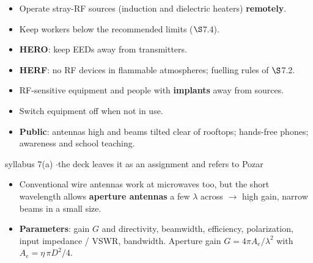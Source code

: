 {
\begin{itemize}
  \item Operate stray-RF sources (induction and dielectric heaters) \textbf{remotely}.
  \item Keep workers below the recommended limits ($\S$7.4).
  \item \textbf{HERO}: keep EEDs away from transmitters.
  \item \textbf{HERF}: no RF devices in flammable atmospheres; fuelling rules of $\S$7.2.
  \item RF-sensitive equipment and people with \textbf{implants} away from sources.
  \item Switch equipment off when not in use.
  \item \textbf{Public}: antennas high and beams tilted clear of rooftops; hands-free phones;
    awareness and school teaching.
\end{itemize}}

\vspace{2pt}


{\color{sub}\footnotesize syllabus 7(a) \gap$\cdot$\gap the deck leaves it as an assignment and refers to Pozar}

\begin{itemize}
  \item Conventional wire antennas work at microwaves too, but the short wavelength allows
    \textbf{aperture antennas} a few $\lambda$ across $\rightarrow$ high gain, narrow beams in a
    small size.
  \item \textbf{Parameters}: gain $G$ and directivity, beamwidth, efficiency, polarization,
    input impedance / VSWR, bandwidth. Aperture gain
    $G = 4\pi A_e/\lambda^2$ with $A_e = \eta\,\pi D^2/4$.
\end{itemize}

